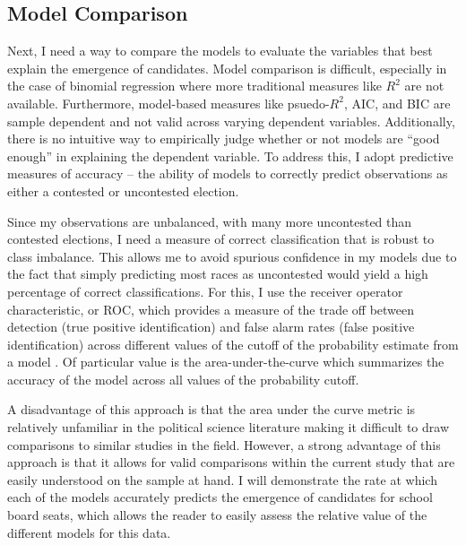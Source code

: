 \subsection{Model Comparison}

Next, I need a way to compare the models to evaluate the variables that best explain 
the emergence of candidates. Model comparison is difficult, especially in the case 
of binomial regression where more traditional measures like $R^{2}$ are not available. 
Furthermore, model-based measures like psuedo-$R^{2}$, AIC, and BIC are sample dependent 
and not valid across varying dependent variables. Additionally, there is no intuitive way 
to empirically judge whether or not models are ``good enough'' in explaining the 
dependent variable. To address this, I adopt predictive measures of accuracy -- 
the ability of models to correctly predict observations as either a contested or 
uncontested election. 

Since my observations are unbalanced, with many more uncontested than contested 
elections, I need a measure of correct classification that is robust to class 
imbalance. This allows me to avoid spurious confidence in my models due to the fact 
that simply predicting most races as uncontested would yield a high percentage of 
correct classifications. For this, I use the receiver operator characteristic, or ROC,  
which provides a measure of the trade off between detection (true positive identification) 
and false alarm rates (false positive identification) across different values of 
the cutoff of the probability estimate from a model \citep{hanley, zwieg}. Of 
particular value is the area-under-the-curve which summarizes the accuracy of 
the model across all values of the probability cutoff. 

A disadvantage of this approach is that the area under the curve metric is relatively 
unfamiliar in the political science literature making it difficult to draw comparisons 
to similar studies in the field. However, a strong advantage of this approach is that 
it allows for valid comparisons within the current study that are easily understood 
on the sample at hand. I will demonstrate the rate at which each of the models 
accurately predicts the emergence of candidates for school board seats, which 
allows the reader to easily assess the relative value of the different models 
for this data. 

